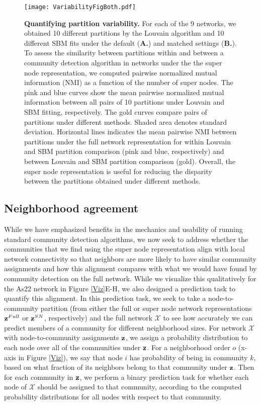 \begin{figure}
\centering
\texttt{[image: VariabilityFigBoth.pdf]}
\caption{{\bf Quantifying partition variability.} For each of the 9 networks, we obtained 10 different partitions by the Louvain algorithm and 10 different SBM fits under the default ({\bf A.}) and matched settings ({\bf B.}). To assess the similarity between partitions within and between a community detection algorithm in networks under the the super node representation, we computed pairwise normalized mutual information (NMI) as a function of the number of super nodes. The pink and blue curves show the mean pairwise normalized mutual information between all pairs of 10 partitions under Louvain and SBM fitting, respectively. The gold curves compare pairs of partitions under different methods. Shaded area denotes standard deviation. Horizontal lines indicates the mean pairwise NMI between partitions under the full network representation for within Louvain and SBM partition comparison (pink and blue, respectively) and between Louvain and SBM partition comparison (gold). Overall, the super node representation is useful for reducing the disparity between the partitions obtained under different methods.}
\label{VAR}
\end{figure}

\subsection{Neighborhood agreement}
While we have emphasized benefits in the mechanics and usability of running standard community detection algorithms, we now seek to address whether the communities that we find using the super node representation align with local network connectivity so that neighbors are more likely to have similar community assignments and how this alignment compares with what we would have found by community detection on the full network. While we visualize this qualitatively for the As22 network in Figure \ref{Viz}E-H, we also designed a prediction task to quantify this alignment. In this prediction task, we seek to take a node-to-community partition (from either the full or super node network representations ${\bf z}^{Full}$ or ${\bf z}^{SN}$, respectively) and the full network ${\mathcal X}$ to see how accurately we can predict members of a community for different neighborhood sizes.
For network ${\mathcal X}$ with node-to-community assignments ${\bf z}$, we assign a probability distribution to each node over all of the communities under ${\bf z}$. For a neighborhood order $o$ (x-axis in Figure \ref{Viz}), we say that node $i$ has probability of being in community $k$, based on what fraction of its neighbors belong to that community under ${\bf z}$. Then for each community in ${\bf z}$, we perform a binary prediction task for whether each node of ${\mathcal X}$ should be assigned to that community, according to the computed probability distributions for all nodes with respect to that community. 

